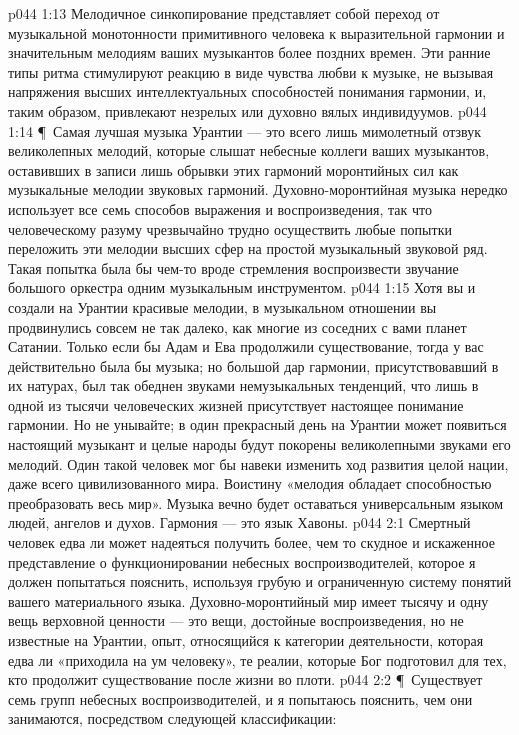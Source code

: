 \vs p044 1:13 Мелодичное синкопирование представляет собой переход от музыкальной монотонности примитивного человека к выразительной гармонии и значительным мелодиям ваших музыкантов более поздних времен. Эти ранние типы ритма стимулируют реакцию в виде чувства любви к музыке, не вызывая напряжения высших интеллектуальных способностей понимания гармонии, и, таким образом, привлекают незрелых или духовно вялых индивидуумов.
\vs p044 1:14 \P\ Самая лучшая музыка Урантии --- это всего лишь мимолетный отзвук великолепных мелодий, которые слышат небесные коллеги ваших музыкантов, оставивших в записи лишь обрывки этих гармоний моронтийных сил как музыкальные мелодии звуковых гармоний. Духовно\hyp{}моронтийная музыка нередко использует все семь способов выражения и воспроизведения, так что человеческому разуму чрезвычайно трудно осуществить любые попытки переложить эти мелодии высших сфер на простой музыкальный звуковой ряд. Такая попытка была бы чем\hyp{}то вроде стремления воспроизвести звучание большого оркестра одним музыкальным инструментом.
\vs p044 1:15 Хотя вы и создали на Урантии красивые мелодии, в музыкальном отношении вы продвинулись совсем не так далеко, как многие из соседних с вами планет Сатании. Только если бы Адам и Ева продолжили существование, тогда у вас действительно была бы музыка; но большой дар гармонии, присутствовавший в их натурах, был так обеднен звуками немузыкальных тенденций, что лишь в одной из тысячи человеческих жизней присутствует настоящее понимание гармонии. Но не унывайте; в один прекрасный день на Урантии может появиться настоящий музыкант и целые народы будут покорены великолепными звуками его мелодий. Один такой человек мог бы навеки изменить ход развития целой нации, даже всего цивилизованного мира. Воистину «мелодия обладает способностью преобразовать весь мир». Музыка вечно будет оставаться универсальным языком людей, ангелов и духов. Гармония --- это язык Хавоны.
\vs p044 2:1 Смертный человек едва ли может надеяться получить более, чем то скудное и искаженное представление о функционировании небесных воспроизводителей, которое я должен попытаться пояснить, используя грубую и ограниченную систему понятий вашего материального языка. Духовно\hyp{}моронтийный мир имеет тысячу и одну вещь верховной ценности --- это вещи, достойные воспроизведения, но не известные на Урантии, опыт, относящийся к категории деятельности, которая едва ли «приходила на ум человеку», те реалии, которые Бог подготовил для тех, кто продолжит существование после жизни во плоти.
\vs p044 2:2 \P\ Существует семь групп небесных воспроизводителей, и я попытаюсь пояснить, чем они занимаются, посредством следующей классификации:
